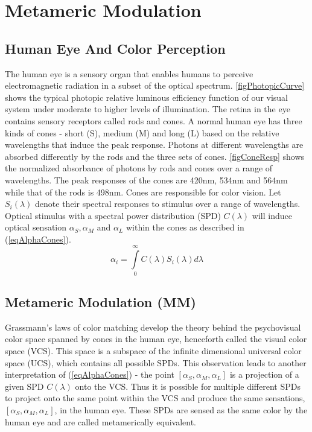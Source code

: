 \section{Metameric Modulation}
\label{sec:metameric}
\graphicspath{{_MIMOColor/figures_mm/}}

\subsection{Human Eye And Color Perception}
\label{subsec:metamericEye}
The human eye is a sensory organ that enables humans to perceive electromagnetic radiation in a subset of the optical spectrum. \figurename{ \ref{figPhotopicCurve}} \cite{jai89a} shows the typical photopic relative luminous efficiency function of our visual system under moderate to higher levels of illumination. The retina in the eye contains sensory receptors called rods and cones. A normal human eye has three kinds of cones - short (S), medium (M) and long (L) based on the relative wavelengths that induce the peak response. Photons at different wavelengths are absorbed differently by the rods and the three sets of cones. \figurename{ \ref{figConeResp}} \cite{wan96a} shows the normalized absorbance of photons by rods and cones over a range of wavelengths. The peak responses of the cones are 420nm, 534nm and 564nm while that of the rods is 498nm. Cones are responsible for color vision. Let $S_{i}(\lambda)$ denote their spectral responses to stimulus over a range of wavelengths. Optical stimulus with a spectral power distribution (SPD) $C(\lambda)$ will induce optical sensation ${\alpha}_{S}, {\alpha}_{M}$ and ${\alpha}_{L}$ within the cones as described in (\ref{eqAlphaCones}).
\begin{equation}
	\label{eqAlphaCones}
	\alpha_{i} = \int\limits_{0}^{\infty} C(\lambda)S_{i}(\lambda)d\lambda
\end{equation}

\subsection{Metameric Modulation (MM)}
Grassmann's laws \cite{gra54a} of color matching develop the theory behind the psychovisual color space spanned by cones in the human eye, henceforth called the visual color space (VCS).  This space is a subspace  of the infinite dimensional universal color space (UCS), which contains all possible SPDs. This observation leads to another interpretation of (\ref{eqAlphaCones}) - the point $[{\alpha}_{S},{\alpha}_{M},{\alpha}_{L}]$ is a projection of a given SPD $C(\lambda)$ onto the VCS. Thus it is possible for multiple different SPDs to project onto the same point within the VCS and produce the same sensations, $[{\alpha}_{S},{\alpha}_{M},{\alpha}_{L}]$, in the human eye. These SPDs are sensed as the same color by the human eye and are called metamerically equivalent.

